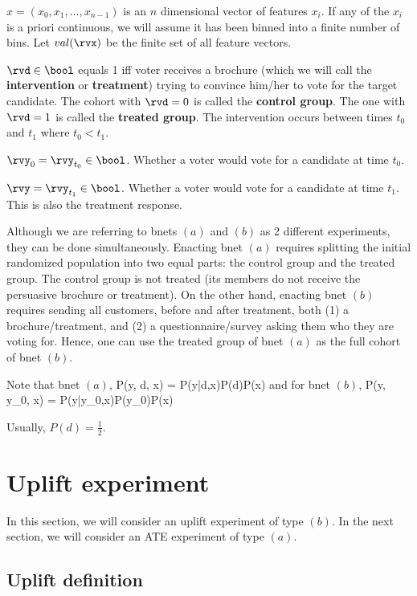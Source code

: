 $x=(x_0, x_1,\dots, x_{n-1})$ is an $n$ dimensional 
vector of features $x_i$. If any of the $x_i$
is a priori continuous, we will
assume it has  been binned into
a finite number of bins.
Let $val(\rvx)$ be the finite set of  all feature vectors.

$\rvd\in\bool$ equals 1 iff voter receives
a brochure (which
we will call the {\bf intervention}
or {\bf treatment}) trying to convince him/her to vote 
for the target  candidate. The cohort with $\rvd=0$ is called the {\bf control group}. The one with $\rvd=1$ is called the {\bf treated group}.
The intervention occurs between times $t_0$ and $t_1$
where $t_0<t_1$.

$\rvy_0=\rvy_{t_0}\in \bool$. Whether a voter would
vote for a candidate at time $t_0$.

$\rvy=\rvy_{t_1}\in \bool$. Whether a voter would
vote for a candidate at time $t_1$. This is also
the treatment response.

Although we are referring to bnets $(a)$
and $(b)$ as 2 different experiments, they can be done
simultaneously. Enacting
bnet $(a)$ requires splitting the initial 
randomized population into two equal parts:
the control group and the treated group.
The control group is not treated (its members do
not receive the persuasive brochure or treatment). On the other hand, enacting bnet $(b)$ requires
sending all customers, before and after treatment, both (1) a brochure/treatment,
and  (2) a questionnaire/survey asking them who they are voting for.
Hence, one can use the treated group of
bnet $(a)$ as the full cohort of bnet $(b)$.

Note that bnet $(a)$, 
\beq
P(y, d, x) = P(y|d,x)P(d)P(x)
\eeq
and for bnet $(b)$,
\beq
P(y, y_0, x) = P(y|y_0,x)P(y_0)P(x)
\eeq

Usually, $P(d) = \frac{1}{2}$.


\section{Uplift experiment}
In this section, we will consider an
uplift experiment of type $(b)$.
In the next section, we will
consider an ATE experiment of type $(a)$.

\subsection{Uplift definition}

